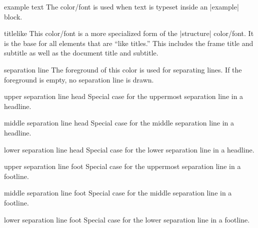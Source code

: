 \begin{element}{example text}\no\yes\yes
  The color/font is used when text is typeset inside an |example| block.
\end{element}

\begin{element}{titlelike}\no\yes\yes
  This color/font is a more specialized form of the |structure| color/font. It is the base for all elements that are ``like titles.'' This includes the frame title and subtitle as well as the document title and subtitle.
\end{element}

\begin{element}{separation line}\no\yes\no
  The foreground of this color is used for separating lines. If the foreground is empty, no separation line is drawn.
\end{element}

\begin{element}{upper separation line head}\no\yes\no
  Special case for the uppermost separation line in a headline.
\end{element}

\begin{element}{middle separation line head}\no\yes\no
  Special case for the middle separation line in a headline.
\end{element}

\begin{element}{lower separation line head}\no\yes\no
  Special case for the lower separation line in a headline.
\end{element}

\begin{element}{upper separation line foot}\no\yes\no
  Special case for the uppermost separation line in a footline.
\end{element}

\begin{element}{middle separation line foot}\no\yes\no
  Special case for the middle separation line in a footline.
\end{element}

\begin{element}{lower separation line foot}\no\yes\no
  Special case for the lower separation line in a footline.
\end{element}


